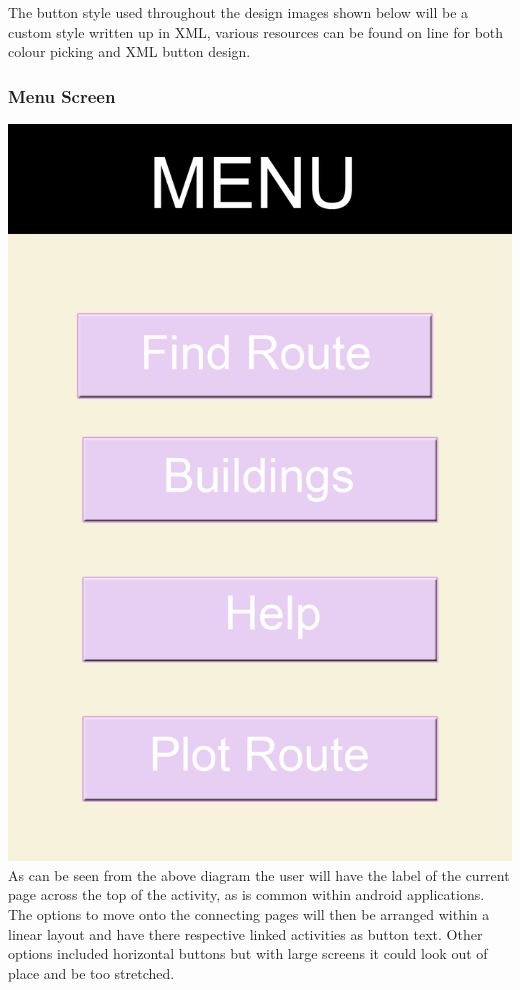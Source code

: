 \documentclass[10pt,a4paper]{article}
\begin{document}
The button style used throughout the design images shown below will be a custom style written up in XML, various resources can be found on line for both colour picking and XML button design. 
\subsubsection{Menu Screen}

\includegraphics[scale=0.6]{Menu.png}\\
As can be seen from the above diagram the user will have the label of the current page across the top of the activity, as is common within android applications. The options to move onto the connecting pages will then be arranged within a linear layout and have there respective linked activities as button text. Other options included horizontal buttons but with large screens it could look out of place and be too stretched.
\end{document}
